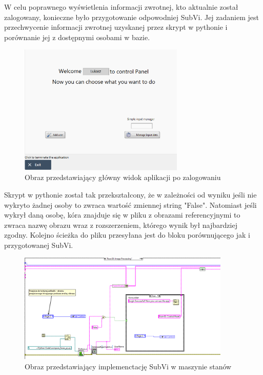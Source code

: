 \documentclass{report}
\begin{document}
W celu poprawnego wyświetlenia informacji zwrotnej, kto aktualnie został zalogowany, konieczne było przygotowanie odpowodniej
SubVi. Jej zadaniem jest przechwycenie informacji zwrotnej uzyskanej przez skrypt w pythonie i porównanie jej z dostępnymi osobami w bazie. 

\begin{figure}[H]
    \centering
    \includegraphics[width=0.7\textwidth]{src/Logged.png}
    \caption{Obraz przedstawiający główny widok aplikacji po zalogowaniu}
    \label{fig:first-att}
\end{figure}

Skrypt w pythonie został tak przekształcony, że w zależności od wyniku jeśli nie wykryto żadnej osoby to zwraca wartość zmiennej string "False".
Natomiast jeśli wykrył daną osobę, kóra znajduje się w pliku z obrazami referencyjnymi to zwraca nazwę obrazu wraz z rozszerzeniem, którego wynik był najbardziej zgodny.
Kolejno ścieżka do pliku przesyłana jest do bloku porównującego jak i przygotowanej SubVi.

\begin{figure}[H]
    \centering
    \includegraphics[width=0.9\textwidth]{src/Database/Database_read.png}
    \caption{Obraz przedstawiający implemenctację SubVi w maszynie stanów}
    \label{fig:first-att}
\end{figure}
\end{document}
